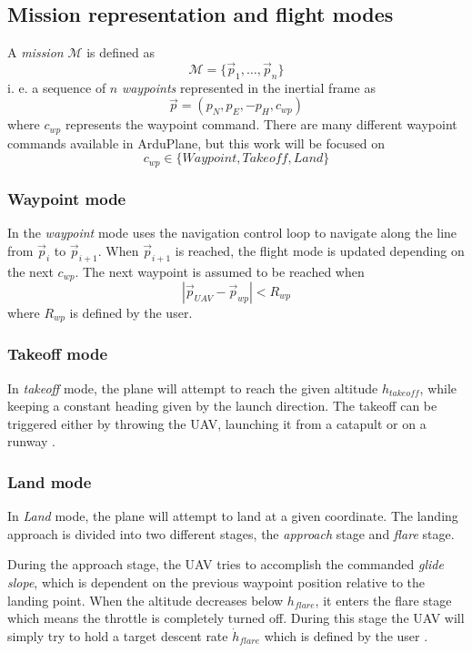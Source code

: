 \subsection{Mission representation and flight modes}
A \textit{mission} $\mathcal{M}$ is defined as 
\begin{equation}
    \mathcal{M} = \{\vec{p}_1, \hdots, \vec{p}_n\}
\end{equation}
i. e. a sequence of $n$ \textit{waypoints} represented in the inertial frame as 
\begin{equation}
    \vec{p}=(p_N, p_E, -p_H, c_{wp})
\end{equation}
where $c_{wp}$ represents the waypoint command. There are many different waypoint commands available
in ArduPlane, but this work will be focused on 
\begin{equation}
    c_{wp}\in \{Waypoint, Takeoff, Land\}
\end{equation}
\subsubsection{Waypoint mode}
In the \textit{waypoint} mode uses the navigation control loop
to navigate along the line from $\vec{p}_i$ to $\vec{p}_{i+1}$. When $\vec{p}_{i+1}$ is reached, the flight mode
is updated depending on the next $c_{wp}$. The next waypoint is assumed to be reached when
\begin{equation}
    |\vec{p}_{UAV}-\vec{p}_{wp}| < R_{wp}
\end{equation}
where $R_{wp}$ is defined by the user.
\subsubsection{Takeoff mode}
In \textit{takeoff} mode, the plane will attempt to reach the given altitude $h_{takeoff}$, while
keeping a constant heading given by the launch direction. The takeoff can be triggered either
by throwing the UAV, launching it from a catapult or on a runway \cite{ardupilot_takeoff}.

\subsubsection{Land mode}
In \textit{Land} mode, the plane will attempt to land at a given coordinate. The landing approach 
is divided into two different stages, the \textit{approach} stage and \textit{flare} stage.

During the approach stage, the UAV tries to accomplish the commanded \textit{glide slope}, which is
dependent on the previous waypoint position relative to the landing point. When the altitude decreases
below $h_{flare}$, it enters the flare stage which means the throttle is completely turned off. 
During this stage the UAV will simply try to hold a target descent rate $\dot{h}_{flare}$ which is
defined by the user \cite{ardupilot_land}.